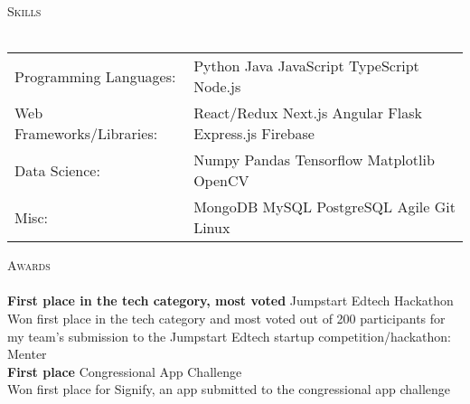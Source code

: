 \documentclass[a4paper]{article}
\newcommand{\lineunder} {
    \vspace*{-8pt} \\
    \hspace*{-18pt} \hrulefill \\
}
\newcommand{\header} [1] {
    {\hspace*{-18pt}\vspace*{6pt} \textsc{#1}}
    \vspace*{-6pt} \lineunder
}
\begin{document}
\header{Skills}
\begin{tabular}{ l l }
	Programming Languages: & Python Java JavaScript TypeScript Node.js             \\
	Web Frameworks/Libraries:  & React/Redux Next.js Angular Flask Express.js Firebase \\
	Data Science:          & Numpy Pandas Tensorflow Matplotlib OpenCV                           \\
	Misc:             & MongoDB MySQL PostgreSQL Agile Git Linux                       \\
\end{tabular}
\vspace{1mm}

\header{Awards}
\textbf{First place in the tech category, most voted} \hfill Jumpstart Edtech Hackathon\\
Won first place in the tech category and most voted out of 200 participants for my team’s submission to the Jumpstart Edtech startup competition/hackathon: Menter\\
\vspace*{2mm}
\textbf{First place} \hfill Congressional App Challenge\\
Won first place for Signify, an app submitted to the congressional app challenge\\

\ 
\end{document}
